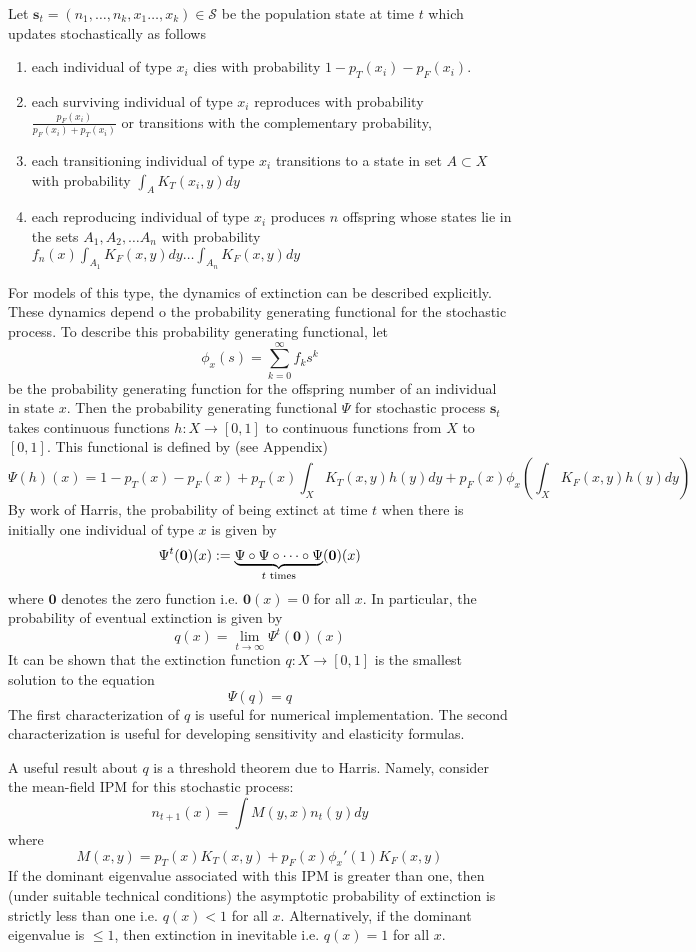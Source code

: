 \documentclass{amsart}
\def\S{\mathcal S}
\def\s{\mathbf s}
\begin{document}
Let $\s_t=( n_1,\dots, n_k, x_1\dots , x_k)\in \S$ be the population state at time $t$ which updates stochastically as follows 
\begin{enumerate}
\item each individual of type $x_i$ dies with probability $1-p_T(x_i)-p_F(x_i)$.
\item each surviving individual of type $x_i$ reproduces with probability $\frac{p_F(x_i)}{p_F(x_i)+p_T(x_i)}$ or transitions with the complementary probability, 
\item each transitioning individual of type $x_i$  transitions to a state in set $A\subset X$ with probability $\int_A K_T(x_i,y)dy$
\item each reproducing individual of type $x_i$  produces $n$ offspring whose states lie in the sets $A_1,A_2,\dots A_n$ with probability $f_n(x) \int_{A_1} K_F(x,y)dy\dots \int_{A_n} K_F(x,y)dy$
\end{enumerate}


For models of this type, the dynamics of extinction can be described explicitly. These dynamics depend o the probability generating functional for the stochastic process. To describe this probability generating functional, let 
\[
\phi_x(s) = \sum_{k=0}^\infty f_k s^k
\]
be the probability generating function for the offspring number of an individual in state $x$. Then the probability generating functional $\Psi$ for stochastic process $\s_t$ takes continuous functions $h:X\to [0,1]$ to continuous functions from $X$ to $[0,1]$. This functional is defined by (see Appendix)
\[
\Psi (h) (x) =1-p_T(x)-p_F(x)+  p_T(x) \int_X K_T(x,y) h(y) dy + p_F(x)\phi_x\left( \int_X K_F(x,y) h(y)dy\right)
\]
By work of Harris, the probability of being extinct at time $t$ when there is initially one individual of type $x$ is given by 
\[
\Psi^t(\mathbf 0)(x):=\underbrace{\Psi \circ \Psi \circ \dots \circ \Psi}_{t\,\,\rm{ times}}({\mathbf 0})(x)
\]
where $\mathbf 0$ denotes the zero function i.e. $\mathbf 0(x)=0$ for all $x$. In particular, the probability of eventual extinction is given by 
\[
q(x)=\lim_{t\to\infty} \Psi^t (\mathbf 0)(x)
\]
It can be shown that the extinction function  $q:X\to [0,1]$ is the smallest solution to the equation 
\[
\Psi (q) = q
\]
The first characterization of $q$ is useful for numerical implementation. The second characterization is useful for developing sensitivity and elasticity formulas. 

A useful result about $q$ is a threshold theorem due to Harris. Namely, consider the mean-field IPM for this stochastic process:
\[
n_{t+1}(x)=\int M(y,x) n_t(y) dy
\]
where
\[
M(x,y)=  p_T(x) K_T(x,y)  + p_F(x) \phi_x'(1) K_F(x,y) 
\]
If the dominant eigenvalue associated with this IPM is greater than one, then (under suitable technical conditions) the asymptotic probability of extinction is strictly less than one i.e. $q(x)<1$ for all $x$. Alternatively, if the dominant eigenvalue is $\le 1$, then extinction in inevitable i.e. $q(x)=1$ for all $x$. 
\end{document}
